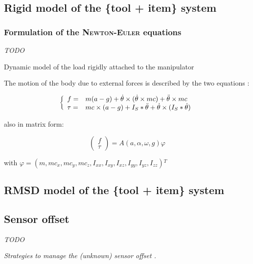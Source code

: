 \documentclass[/home/francois/latex/report/main.tex]{subfiles}
\begin{document}
\subsection{Rigid model of the \{tool + item\} system}

\subsubsection{Formulation of the \textsc{Newton-Euler} equations}
\label{subsubsection:background_newton_equation}

\textit{TODO}

Dynamic model of the load rigidly attached to the manipulator

The motion of the body due to external forces is described by the two equations \cite{Kubus2007, Kubus2008}:

\begin{equation}
 \label{dim_1}
 \left \{
 \begin{array}{l l}
  f =    & m (a - g) + \dot{\theta} \times (\dot{\theta} \times m c) + \ddot{\theta} \times m c \\
  \tau = & m c \times (a - g)
  + I_{S} \ast \ddot{\theta} + \dot{\theta} \times (I_{S} \ast \dot{\theta})
 \end{array}
 \right.
\end{equation}

also in matrix form:

\begin{equation}
 \begin{pmatrix}
  f    \\
  \tau
 \end{pmatrix}
 = A(a, \alpha, \omega, g) \varphi
\end{equation}

with $\varphi = (m, m c_x, m c_y, m c_z, I_{xx}, I_{xy}, I_{xz}, I_{yy}, I_{yz}, I_{zz}) {}^T$

\subsection{\ac{RMSD} model of the \{tool + item\} system}


\subsection{Sensor offset}

\textit{TODO}

{\it
Strategies to manage the (unknown) sensor offset \cite{Kubus2007, Kubus2008}.
}
\end{document}
